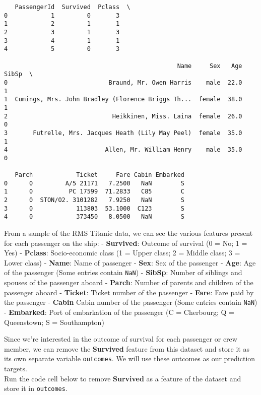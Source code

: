\documentclass[11pt]{article}
\begin{document}
    
    \begin{verbatim}
   PassengerId  Survived  Pclass  \
0            1         0       3   
1            2         1       1   
2            3         1       3   
3            4         1       1   
4            5         0       3   

                                                Name     Sex   Age  SibSp  \
0                            Braund, Mr. Owen Harris    male  22.0      1   
1  Cumings, Mrs. John Bradley (Florence Briggs Th...  female  38.0      1   
2                             Heikkinen, Miss. Laina  female  26.0      0   
3       Futrelle, Mrs. Jacques Heath (Lily May Peel)  female  35.0      1   
4                           Allen, Mr. William Henry    male  35.0      0   

   Parch            Ticket     Fare Cabin Embarked  
0      0         A/5 21171   7.2500   NaN        S  
1      0          PC 17599  71.2833   C85        C  
2      0  STON/O2. 3101282   7.9250   NaN        S  
3      0            113803  53.1000  C123        S  
4      0            373450   8.0500   NaN        S  
    \end{verbatim}

    
    From a sample of the RMS Titanic data, we can see the various features
present for each passenger on the ship: - \textbf{Survived}: Outcome of
survival (0 = No; 1 = Yes) - \textbf{Pclass}: Socio-economic class (1 =
Upper class; 2 = Middle class; 3 = Lower class) - \textbf{Name}: Name of
passenger - \textbf{Sex}: Sex of the passenger - \textbf{Age}: Age of
the passenger (Some entries contain \texttt{NaN}) - \textbf{SibSp}:
Number of siblings and spouses of the passenger aboard - \textbf{Parch}:
Number of parents and children of the passenger aboard -
\textbf{Ticket}: Ticket number of the passenger - \textbf{Fare}: Fare
paid by the passenger - \textbf{Cabin} Cabin number of the passenger
(Some entries contain \texttt{NaN}) - \textbf{Embarked}: Port of
embarkation of the passenger (C = Cherbourg; Q = Queenstown; S =
Southampton)

Since we're interested in the outcome of survival for each passenger or
crew member, we can remove the \textbf{Survived} feature from this
dataset and store it as its own separate variable \texttt{outcomes}. We
will use these outcomes as our prediction targets.\\
Run the code cell below to remove \textbf{Survived} as a feature of the
dataset and store it in \texttt{outcomes}.
\end{document}
